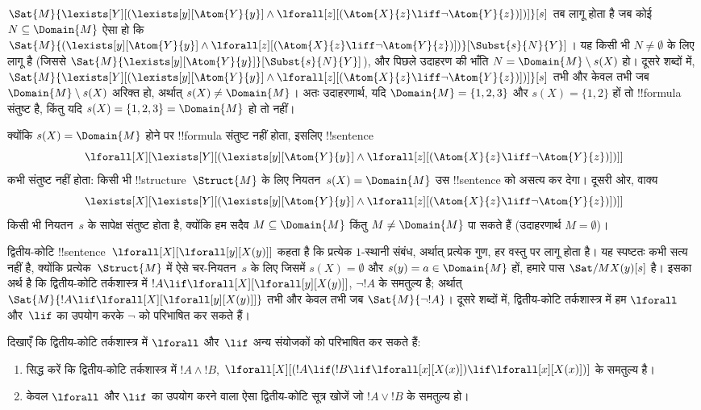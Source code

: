 \documentclass[../../../include/open-logic-section]{subfiles}
\begin{document}
\begin{ex}
  $\Sat{M}{\lexists[Y][(\lexists[y][\Atom{Y}{y}] \land
  \lforall[z][(\Atom{X}{z} \liff \lnot \Atom{Y}{z})])]}[s]$ तब लागू होता
  है जब कोई $N \subseteq \Domain{M}$ ऐसा हो कि
  $\Sat{M}{(\lexists[y][\Atom{Y}{y}] \land \lforall[z][(\Atom{X}{z}
  \liff \lnot \Atom{Y}{z})])}[\Subst{s}{N}{Y}]$। यह किसी भी
  $N \neq \emptyset$ के लिए लागू है (जिससे
  $\Sat{M}{\lexists[y][\Atom{Y}{y}]}[\Subst{s}{N}{Y}]$), और पिछले उदाहरण
  की भाँति $N = \Domain{M} \setminus s(X)$ हो। दूसरे शब्दों में,
  $\Sat{M}{\lexists[Y][(\lexists[y][\Atom{Y}{y}] \land
  \lforall[z][(\Atom{X}{z} \liff \lnot \Atom{Y}{z})])]}[s]$ तभी और केवल
  तभी जब $\Domain{M} \setminus s(X)$ अरिक्त हो, अर्थात् $s(X) \neq
  \Domain{M}$। अतः उदाहरणार्थ, यदि $\Domain{M} = \{1, 2, 3\}$ और
  $s(X) = \{1, 2\}$ हों तो !!{formula} संतुष्ट है, किंतु यदि
  $s(X) = \{1, 2, 3\} = \Domain{M}$ हो तो नहीं।

  क्योंकि $s(X) = \Domain{M}$ होने पर !!{formula} संतुष्ट नहीं होता, इसलिए
  !!{sentence}
  \[
  \lforall[X][\lexists[Y][(\lexists[y][\Atom{Y}{y}] \land
      \lforall[z][(\Atom{X}{z} \liff \lnot \Atom{Y}{z})])]]
  \]
  कभी संतुष्ट नहीं होता: किसी भी !!{structure}~$\Struct{M}$ के लिए
  नियतन~$s(X) = \Domain{M}$ उस !!{sentence} को असत्य कर देगा। दूसरी ओर,
  वाक्य
  \[
  \lexists[X][\lexists[Y][(\lexists[y][\Atom{Y}{y}] \land
      \lforall[z][(\Atom{X}{z} \liff \lnot \Atom{Y}{z})])]]
  \]
  किसी भी नियतन~$s$ के सापेक्ष संतुष्ट होता है, क्योंकि हम सदैव
  $M \subseteq \Domain{M}$ किंतु $M \neq \Domain{M}$ पा सकते हैं
  (उदाहरणार्थ $M = \emptyset$)।
\end{ex}

\begin{ex}
  द्वितीय-कोटि !!{sentence}~$\lforall[X][\lforall[y][X(y)]]$ कहता है कि
  प्रत्येक $1$-स्थानी संबंध, अर्थात् प्रत्येक गुण, हर वस्तु पर लागू होता है।
  यह स्पष्टतः कभी सत्य नहीं है, क्योंकि प्रत्येक~$\Struct{M}$ में ऐसे
  चर-नियतन~$s$ के लिए जिसमें $s(X) = \emptyset$ और $s(y) = a \in
  \Domain{M}$ हों, हमारे पास $\Sat/{M}{X(y)}[s]$ है। इसका अर्थ है कि
  द्वितीय-कोटि तर्कशास्त्र में $!A \lif \lforall[X][\lforall[y][X(y)]]$,
  $\lnot !A$ के समतुल्य है; अर्थात् $\Sat{M}{!A \lif
  \lforall[X][\lforall[y][X(y)]]}$ तभी और केवल तभी जब
  $\Sat{M}{\lnot !A}$। दूसरे शब्दों में, द्वितीय-कोटि तर्कशास्त्र में हम
  $\lforall$ और~$\lif$ का उपयोग करके $\lnot$ को परिभाषित कर सकते हैं।
\end{ex}

\begin{prob}
  दिखाएँ कि द्वितीय-कोटि तर्कशास्त्र में $\lforall$ और~$\lif$ अन्य संयोजकों
  को परिभाषित कर सकते हैं:
  \begin{enumerate}
    \item सिद्ध करें कि द्वितीय-कोटि तर्कशास्त्र में $!A \land !B$,
    $\lforall[X][(!A \lif (!B \lif \lforall[x][X(x)])\lif
    \lforall[x][X(x)])]$ के समतुल्य है।
    \item केवल $\lforall$ और $\lif$ का उपयोग करने वाला ऐसा द्वितीय-कोटि
    सूत्र खोजें जो $!A \lor !B$ के समतुल्य हो।
  \end{enumerate}
\end{prob}
\end{document}

